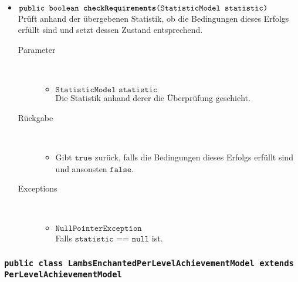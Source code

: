 \begin{description}
\begin{itemize}
		\item $\texttt{public boolean \textbf{checkRequirements}(StatisticModel statistic)}$ \\ Prüft anhand der übergebenen Statistik, ob die Bedingungen dieses Erfolgs erfüllt sind und setzt dessen Zustand entsprechend.
		\begin{description}
		\item[Parameter] \hfill \\
			\vspace{-.8cm}
			\begin{itemize}
				\item $\texttt{StatisticModel statistic}$ \\ Die Statistik anhand derer die Überprüfung geschieht. 
			\end{itemize}
			\item[Rückgabe] \hfill \\
			\vspace{-.8cm}
			\begin{itemize}
				\item Gibt $\texttt{true}$ zurück, falls die Bedingungen dieses Erfolgs erfüllt sind und ansonsten $\texttt{false}$.
			\end{itemize}
			\item[Exceptions] \hfill \\
			\vspace{-.8cm}
			\begin{itemize}
				\item $\texttt{NullPointerException}$ \\ Falls $\texttt{statistic == null}$ ist.
			\end{itemize}
		\end{description}
	\end{itemize}
\end{description}

\subsubsection{\normalfont \texttt{public class \textbf{LambsEnchantedPerLevelAchievementModel} extends PerLevelAchievementModel}}

